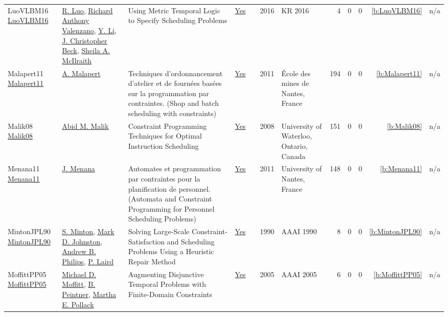{\begin{longtable}{>{\raggedright\arraybackslash}p{3cm}>{\raggedright\arraybackslash}p{6cm}>{\raggedright\arraybackslash}p{6.5cm}rrrp{2.5cm}rrrrr}
LuoVLBM16 \href{http://www.aaai.org/ocs/index.php/KR/KR16/paper/view/12909}{LuoVLBM16} & \hyperref[auth:a819]{R. Luo}, \hyperref[auth:a820]{Richard Anthony Valenzano}, \hyperref[auth:a821]{Y. Li}, \hyperref[auth:a89]{J. Christopher Beck}, \hyperref[auth:a822]{Sheila A. McIlraith} & Using Metric Temporal Logic to Specify Scheduling Problems & \href{../works/LuoVLBM16.pdf}{Yes} & \cite{LuoVLBM16} & 2016 & KR 2016 & 4 & 0 & 0 & \ref{b:LuoVLBM16} & n/a\\
Malapert11 \href{https://tel.archives-ouvertes.fr/tel-00630122}{Malapert11} & \hyperref[auth:a82]{A. Malapert} & Techniques d'ordonnancement d'atelier et de fourn{\'{e}}es bas{\'{e}}es sur la programmation par contraintes. (Shop and batch scheduling with constraints) & \href{../works/Malapert11.pdf}{Yes} & \cite{Malapert11} & 2011 & {\'{E}}cole des mines de Nantes, France & 194 & 0 & 0 & \ref{b:Malapert11} & n/a\\
Malik08 \href{https://hdl.handle.net/10012/3612}{Malik08} & \hyperref[auth:a644]{Abid M. Malik} & Constraint Programming Techniques for Optimal Instruction Scheduling & \href{../works/Malik08.pdf}{Yes} & \cite{Malik08} & 2008 & University of Waterloo, Ontario, Canada & 151 & 0 & 0 & \ref{b:Malik08} & n/a\\
Menana11 \href{https://tel.archives-ouvertes.fr/tel-00785838}{Menana11} & \hyperref[auth:a620]{J. Menana} & Automates et programmation par contraintes pour la planification de personnel. (Automata and Constraint Programming for Personnel Scheduling Problems) & \href{../works/Menana11.pdf}{Yes} & \cite{Menana11} & 2011 & University of Nantes, France & 148 & 0 & 0 & \ref{b:Menana11} & n/a\\
MintonJPL90 \href{http://www.aaai.org/Library/AAAI/1990/aaai90-003.php}{MintonJPL90} & \hyperref[auth:a1230]{S. Minton}, \hyperref[auth:a1231]{Mark D. Johnston}, \hyperref[auth:a1232]{Andrew B. Philips}, \hyperref[auth:a1233]{P. Laird} & Solving Large-Scale Constraint-Satisfaction and Scheduling Problems Using a Heuristic Repair Method & \href{../works/MintonJPL90.pdf}{Yes} & \cite{MintonJPL90} & 1990 & AAAI 1990 & 8 & 0 & 0 & \ref{b:MintonJPL90} & n/a\\
MoffittPP05 \href{http://www.aaai.org/Library/AAAI/2005/aaai05-188.php}{MoffittPP05} & \hyperref[auth:a777]{Michael D. Moffitt}, \hyperref[auth:a778]{B. Peintner}, \hyperref[auth:a779]{Martha E. Pollack} & Augmenting Disjunctive Temporal Problems with Finite-Domain Constraints & \href{../works/MoffittPP05.pdf}{Yes} & \cite{MoffittPP05} & 2005 & AAAI 2005 & 6 & 0 & 0 & \ref{b:MoffittPP05} & n/a\\

\end{longtable}}
